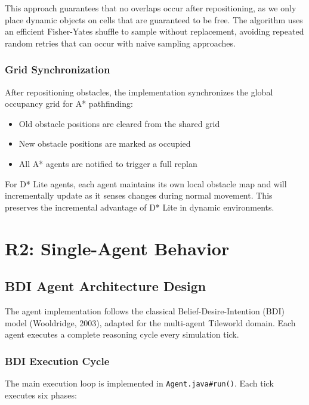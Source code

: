 \documentclass[titlepage=formal,code=listings,logo=../../assets/火炬+英文校名-左右.pdf]{../../SUSTechHomework}
\begin{document}
This approach guarantees that no overlaps occur after repositioning, as we only place dynamic objects on cells that are guaranteed to be free. The algorithm uses an efficient Fisher-Yates shuffle to sample without replacement, avoiding repeated random retries that can occur with naive sampling approaches.

\subsubsection{Grid Synchronization}

After repositioning obstacles, the implementation synchronizes the global occupancy grid for A* pathfinding:

\begin{itemize}
  \item Old obstacle positions are cleared from the shared grid
  \item New obstacle positions are marked as occupied
  \item All A* agents are notified to trigger a full replan
\end{itemize}

For D* Lite agents, each agent maintains its own local obstacle map and will incrementally update as it senses changes during normal movement. This preserves the incremental advantage of D* Lite in dynamic environments.

\section{R2: Single-Agent Behavior}

\subsection{BDI Agent Architecture Design}

The agent implementation follows the classical Belief-Desire-Intention (BDI) model (Wooldridge, 2003), adapted for the multi-agent Tileworld domain. Each agent executes a complete reasoning cycle every simulation tick.

\subsubsection{BDI Execution Cycle}

The main execution loop is implemented in \texttt{Agent.java\#run()}. Each tick executes six phases:
\end{document}

